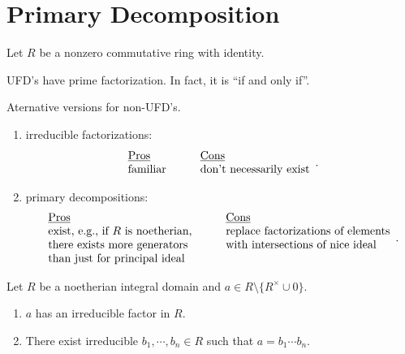 \chapter{Primary Decomposition}

Let $R$ be a nonzero commutative ring with identity.

\begin{discussion}
    UFD's have prime factorization. In fact, it is ``if and only if''. \par 
    Aternative versions for non-UFD's.
    \begin{enumerate}
        \item irreducible factorizations: 
            \[
                \begin{array}{llll}
                    \text{\underline{Pros}} &&& \text{\underline{Cons}} \\
                    \text{familiar} &&& \text{don't necessarily exist} 
                \end{array}.
            \]
        \item 
            primary decompositions:
            \[
                \begin{array}{llll}
                    \text{\underline{Pros}} &&& \text{\underline{Cons}} \\
                    \text{exist, e.g., if $R$ is noetherian,} &&& \text{replace factorizations of elements} \\
                    \text{there exists more generators } &&& \text{with intersections of nice ideal} \\
                    \text{than just for principal ideal}
                \end{array}.
            \]
    \end{enumerate}
\end{discussion}

\begin{theorem}
    Let $R$ be a noetherian integral domain and $a \in R \setminus \{R^{\times} \cup 0\}$.
    \begin{enumerate}
        \item $a$ has an irreducible factor in $R$.
        \item There exist irreducible $b_1,\cdots,b_n \in R$ such that $a = b_1 \cdots b_n$.
    \end{enumerate}
\end{theorem}

